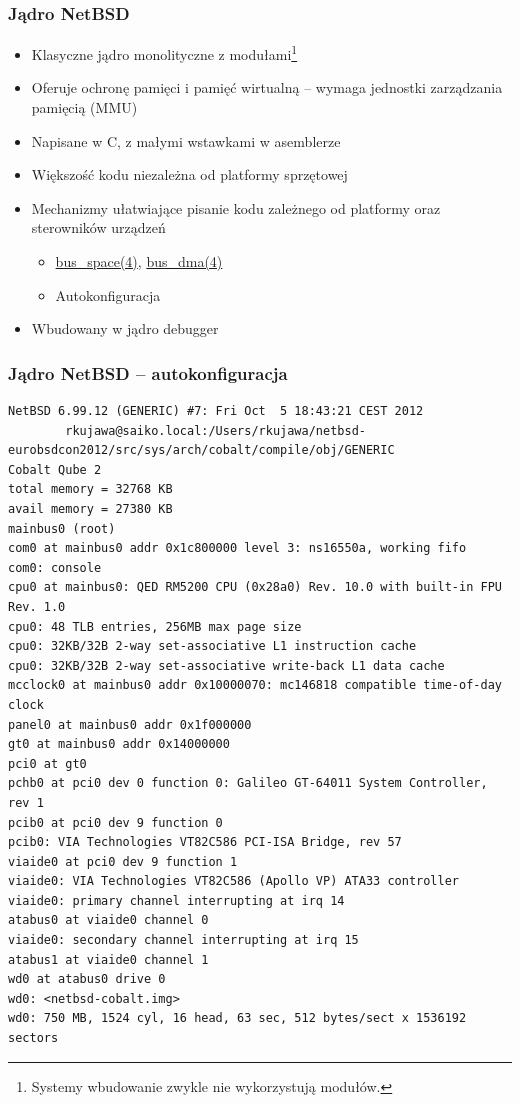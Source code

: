 \documentclass[dvipsnames,table]{beamer}
\begin{document}
\begin{frame}
\frametitle{Jądro NetBSD}
\begin{itemize}
	\item Klasyczne jądro monolityczne z modułami\footnote{Systemy wbudowanie zwykle nie wykorzystują modułów.}
	\item Oferuje ochronę pamięci i pamięć wirtualną -- wymaga jednostki zarządzania pamięcią (MMU)
	\item Napisane w C, z małymi wstawkami w asemblerze
	\item Większość kodu niezależna od platformy sprzętowej
	\item Mechanizmy ułatwiające pisanie kodu zależnego od platformy oraz sterowników urządzeń
	\begin{itemize}
		\item \href{http://netbsd.gw.com/cgi-bin/man-cgi?bus_space++NetBSD-current}{bus\_space(4)}, \href{http://netbsd.gw.com/cgi-bin/man-cgi?bus_dma++NetBSD-current}{bus\_dma(4)}
		\item Autokonfiguracja
	\end{itemize}
	\item Wbudowany w jądro debugger
\end{itemize}
\end{frame}

\begin{frame}[fragile]
\frametitle{Jądro NetBSD -- autokonfiguracja}
\tiny
\begin{verbatim}
NetBSD 6.99.12 (GENERIC) #7: Fri Oct  5 18:43:21 CEST 2012
        rkujawa@saiko.local:/Users/rkujawa/netbsd-eurobsdcon2012/src/sys/arch/cobalt/compile/obj/GENERIC
Cobalt Qube 2
total memory = 32768 KB
avail memory = 27380 KB
mainbus0 (root)
com0 at mainbus0 addr 0x1c800000 level 3: ns16550a, working fifo
com0: console
cpu0 at mainbus0: QED RM5200 CPU (0x28a0) Rev. 10.0 with built-in FPU Rev. 1.0
cpu0: 48 TLB entries, 256MB max page size
cpu0: 32KB/32B 2-way set-associative L1 instruction cache
cpu0: 32KB/32B 2-way set-associative write-back L1 data cache
mcclock0 at mainbus0 addr 0x10000070: mc146818 compatible time-of-day clock
panel0 at mainbus0 addr 0x1f000000
gt0 at mainbus0 addr 0x14000000
pci0 at gt0
pchb0 at pci0 dev 0 function 0: Galileo GT-64011 System Controller, rev 1
pcib0 at pci0 dev 9 function 0
pcib0: VIA Technologies VT82C586 PCI-ISA Bridge, rev 57
viaide0 at pci0 dev 9 function 1
viaide0: VIA Technologies VT82C586 (Apollo VP) ATA33 controller
viaide0: primary channel interrupting at irq 14
atabus0 at viaide0 channel 0
viaide0: secondary channel interrupting at irq 15
atabus1 at viaide0 channel 1
wd0 at atabus0 drive 0
wd0: <netbsd-cobalt.img>
wd0: 750 MB, 1524 cyl, 16 head, 63 sec, 512 bytes/sect x 1536192 sectors\end{verbatim}
\end{frame}
\end{document}
